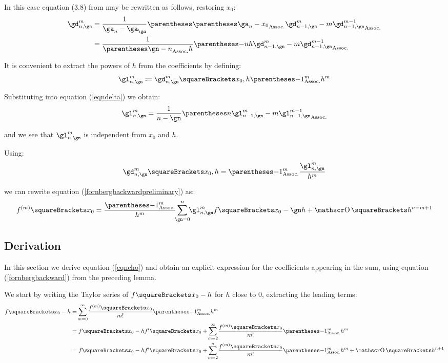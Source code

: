 \documentclass[10pt, a4paper, twoside]{basestyle}
\begin{document}
In this case equation (3.8) from \cite{Fornberg1987} may be rewritten as follows, restoring $x_0$:
\begin{align}
\gd^{m}_{n,\gn} &= \frac{1}{\ga_n - \ga_\gn}\pa{\pa{\ga_n - x_0} \gd^{m}_{n - 1,\gn} - m \gd^{m - 1}_{n - 1,\gn}} \nonumber \\
&= \frac{1}{\pa{\gn - n} h} \pa{-n h \gd^{m}_{n - 1,\gn} - m \gd^{m - 1}_{n - 1,\gn}} \label{eqndelta}
\end{align}

It is convenient to extract the powers of $h$ from the coefficients by defining:
\[
\gl^{m}_{n,\gn} \DefineAs \gd^{m}_{n,\gn}\of{x_0, h} \pa{-1}^m h^m
\]

Substituting into equation (\ref{eqndelta}) we obtain:
\[
\gl^{m}_{n,\gn} = \frac{1}{n - \gn} \pa{n \gl^{m}_{n - 1,\gn} - m \gl^{m - 1}_{n - 1,\gn}}
\]

and we see that $\gl^{m}_{n,\gn}$ is independent from $x_0$ and $h$.

Using:
\[
\gd^{m}_{n,\gn}\of{x_0, h} = \pa{-1}^m \frac{\gl^{m}_{n,\gn}}{h^m}
\]

we can rewrite equation (\ref{fornbergbackwardpreliminary}) as:
\begin{equation}
f^{(m)}\of{x_0} = \frac{\pa{-1}^m}{h^m} \sum{\gn = 0}[n]{\gl^{m}_{n,\gn} f\of{x_0 - \gn h}} + \BigO\of{h^{n - m + 1}}
\label{fornbergbackward}
\end{equation}


\subsection*{Derivation}
In this section we derive equation (\ref{eqncho}) and obtain an explicit expression for the coefficients appearing in the sum, using equation (\ref{fornbergbackward}) from the preceding lemma.

We start by writing the Taylor series of $f\of{x_0 - h}$ for $h$ close to $0$, extracting the leading terms:
\begin{align}
f\of{x_0 - h} &= \sum{m = 0}[\infty]{\frac{f^{(m)}\of{x_0}}{\Factorial{m}} \pa{-1}^m h^m} \nonumber \\
&=f\of{x_0} - h f\der\of{x_0} + \sum{m = 2}[\infty]{\frac{f^{(m)}\of{x_0}}{\Factorial{m}} \pa{-1}^m h^m} \nonumber \\
&=f\of{x_0} - h f\der\of{x_0} + \sum{m = 2}[n]{\frac{f^{(m)}\of{x_0}}{\Factorial{m}} \pa{-1}^m h^m} + \BigO\of{h^{n+1}} \label{eqntaylor}
\end{align}
\end{document}
